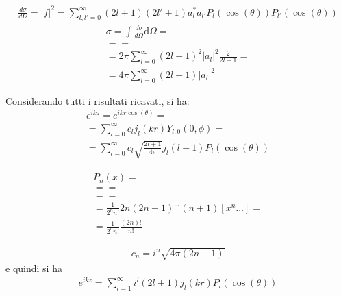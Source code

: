 \begin{equation}\begin{split}
\frac{d\sigma}{d\Omega}=\left|f\right|^2=\sum_{l,l'=0}^{\infty }{\left(2l+1\right)\left(2l'+1\right)a_l^*a_{l'}P_l\left(\cos{\left(\theta\right)}\right)P_{l'}\left(\cos{\left(\theta\right)}\right)}
\end{split}\end{equation}
\begin{equation}\begin{split}
\sigma =\int{\frac{d\sigma}{d\Omega}\textrm{d}\Omega}=\\
= =\\
=2\pi\sum_{l=0}^{\infty }{\left(2l+1\right)^2|a_l|^2\frac{2}{2l+1}}=\\
=4\pi\sum_{l=0}^{\infty }{\left(2l+1\right)\left|a_l\right|^2}
\end{split}\end{equation}

Considerando tutti i risultati ricavati, si ha:
\begin{equation}\begin{split}
e^{ikz}=e^{ikr\cos{\left(\theta\right)}}=\\
=\sum_{l=0}^{\infty }{c_lj_l\left(kr\right)Y_{l,0}\left(0,\phi\right)}=\\
=\sum_{l=0}^{\infty }{c_l\sqrt{\frac{2l+1}{4\pi}}j_l\left(l+1\right)P_l\left(\cos{\left(\theta\right)}\right)}
\end{split}\end{equation}


\begin{equation}\begin{split}
P_n\left(x\right)=\\
==\\
==\\
=\frac{1}{2^nn!}2n\left(2n-1\right)^{\dots}\left(n+1\right)\left[x^n\dots\right]=\\
=\frac{1}{2^nn!}\frac{\left(2n\right)!}{n!}
\end{split}\end{equation}


\begin{equation}\begin{split}
c_n=i^n\sqrt{4\pi\left(2n+1\right)}
\end{split}\end{equation}
e quindi si ha
\begin{equation}\begin{split}
e^{ikz}=\sum_{l=1}^{\infty }{i^l\left(2l+1\right)j_l\left(kr\right)P_l\left(\cos{\left(\theta\right)}\right)}
\end{split}\end{equation}


